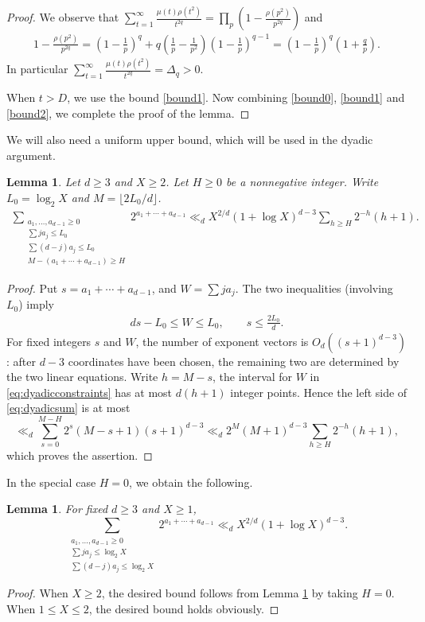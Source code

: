 \documentclass[12pt,a4paper,reqno]{amsart}
\numberwithin{equation}{section}
\newcommand{\1}{\mathbf 1}
\theoremstyle{plain}
\newtheorem{lemma}[theorem]{Lemma}
\theoremstyle{definition}
\begin{document}
\begin{proof}
We observe that $\sum_{t=1}^\infty\frac{\mu(t)\rho(t^2)}{t^{2q}}=\prod_{p}(1-\frac{\rho(p^2)}{p^{2q}})$ and 
\begin{align*} 1-\frac{\rho(p^2)}{p^{2q}}=
 \left(1-\frac1p\right)^q
 +q\left(\frac1p-\frac1{p^2}\right)
       \left(1-\frac1p\right)^{q-1}
 =\left(1-\frac1p\right)^q\left(1+\frac qp\right).
\end{align*}
In particular $\sum_{t=1}^\infty\frac{\mu(t)\rho(t^2)}{t^{2q}}=\Delta_q>0$.

When $t>D$, we use the bound \eqref{bound1}. Now combining \eqref{bound0}, \eqref{bound1} and \eqref{bound2}, we complete the proof of the lemma.
\end{proof}

We will also need a uniform upper bound, which will be used in the dyadic argument. 
\begin{lemma}\label{lem:dyadicH}
Let $d\geq3$ and $X\geq2$. Let $H\geq 0$ be a nonnegative integer. Write $L_0=\log_2X$ and $M=\lfloor2L_0/d\rfloor$.
\begin{align}
 \sum_{\substack{a_1,\ldots,a_{d-1}\geq0\\
 \sum j a_j\leq L_0\\
 \sum(d-j)a_j\leq L_0
 \\ M-(a_1+\cdots +a_{d-1})\geq H}}
 2^{a_1+\cdots+a_{d-1}}
 \ll_d X^{2/d}(1+\log X)^{d-3}
       \sum_{h\geq H}2^{-h}(h+1).
\label{eq:dyadicsum}
\end{align}
\end{lemma}

\begin{proof}
Put $s=a_1+\cdots+a_{d-1}$, and $W=\sum ja_j$.
The two inequalities (involving $L_0$) imply
\begin{align}
 d s-L_0\leq W\leq L_0,
 \qquad s\leq\frac{2L_0}{d}.
\label{eq:dyadicconstraints}
\end{align}
For fixed integers $s$ and $W$, the number of exponent vectors is
$O_d((s+1)^{d-3})$: after $d-3$ coordinates have been chosen, the
remaining two are determined by the two linear equations.  Write $h=M-s$, the interval for $W$ in
\eqref{eq:dyadicconstraints} has at most $d(h+1)$ integer points.  Hence the
left side of \eqref{eq:dyadicsum} is at most
\[
 \ll_d\sum_{s=0}^{M-H}2^s(M-s+1)(s+1)^{d-3}
 \ll_d2^M(M+1)^{d-3}
       \sum_{h\geq H}2^{-h}(h+1),
\]
which proves the assertion.
\end{proof}

In the special case $H=0$, we obtain the following.
\begin{lemma}\label{lem:dyadic}
For fixed $d\geq3$ and $X\geq 1$,
\[
 \sum_{\substack{a_1,\ldots,a_{d-1}\geq0\\
 \sum j a_j\leq\log_2X\\
 \sum(d-j)a_j\leq\log_2X}}
 2^{a_1+\cdots+a_{d-1}}
 \ll_d X^{2/d}(1+\log X)^{d-3}.
\]
\end{lemma}
\begin{proof}When $X\geq 2$, the desired bound follows from Lemma \ref{lem:dyadicH} by taking $H=0$. When $1\leq X\leq 2$, the desired bound holds obviously.\end{proof}
\end{document}
